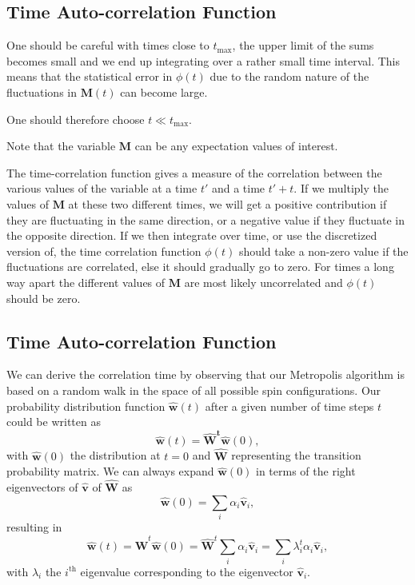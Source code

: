 \documentclass[%
oneside,                 %
final,                   %
10pt]{article}
\begin{document}
\subsection{Time Auto-correlation Function}
\begin{block}{}
One should be careful with times close to $t_{\mathrm{max}}$, the upper limit of the sums 
becomes small and we end up integrating over a rather small time interval. This means that the statistical
error in $\phi(t)$ due to the random nature of the fluctuations in $\mathbf{M}(t)$ can become large.

One should therefore choose $t \ll t_{\mathrm{max}}$.

Note that the variable $\mathbf{M}$ can be any expectation values of interest.

The time-correlation function gives a measure of the correlation between the various values of the variable 
at a time $t'$ and a time $t'+t$. If we multiply the values of $\mathbf{M}$ at these two different times,
we will get a positive contribution if they are fluctuating in the same direction, or a negative value
if they fluctuate in the opposite direction. If we then integrate over time, or use the discretized version of, the time correlation function $\phi(t)$ should take a non-zero value if the fluctuations are 
correlated, else it should gradually go to zero. For times a long way apart 
the different values of $\mathbf{M}$  are most likely 
uncorrelated and $\phi(t)$ should be zero.
\end{block}

\subsection{Time Auto-correlation Function}
\begin{block}{}
We can derive the correlation time by observing that our Metropolis algorithm is based on a random
walk in the space of all  possible spin configurations. 
Our probability 
distribution function $\mathbf{\hat{w}}(t)$ after a given number of time steps $t$ could be written as
\[
   \mathbf{\hat{w}}(t) = \mathbf{\hat{W}^t\hat{w}}(0),
\]
with $\mathbf{\hat{w}}(0)$ the distribution at $t=0$ and $\mathbf{\hat{W}}$ representing the 
transition probability matrix. 
We can always expand $\mathbf{\hat{w}}(0)$ in terms of the right eigenvectors of 
$\mathbf{\hat{v}}$ of $\mathbf{\hat{W}}$ as 
\[
    \mathbf{\hat{w}}(0)  = \sum_i\alpha_i\mathbf{\hat{v}}_i,
\]
resulting in 
\[
   \mathbf{\hat{w}}(t) = \mathbf{\hat{W}}^t\mathbf{\hat{w}}(0)=\mathbf{\hat{W}}^t\sum_i\alpha_i\mathbf{\hat{v}}_i=
\sum_i\lambda_i^t\alpha_i\mathbf{\hat{v}}_i,
\]
with $\lambda_i$ the $i^{\mathrm{th}}$ eigenvalue corresponding to  
the eigenvector $\mathbf{\hat{v}}_i$. 
\end{block}
\end{document}
